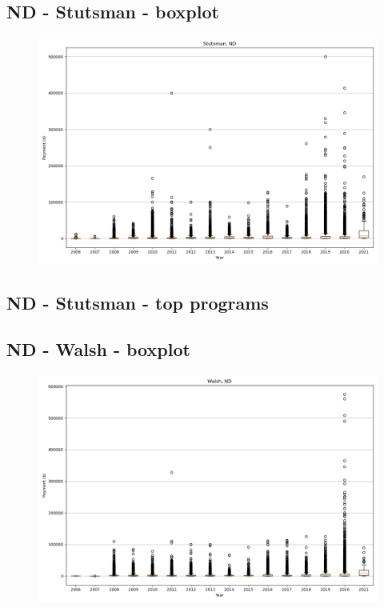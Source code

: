 \subsection*{ND - Stutsman - boxplot}
\begin{figure}[h]
\centering
\includegraphics[width=7in]{../output/boxplots/counties/Stutsman-ND_boxplot.png}
\end{figure}


\subsection*{ND - Stutsman - top programs}

\newpage
\subsection*{ND - Walsh - boxplot}
\begin{figure}[h]
\centering
\includegraphics[width=7in]{../output/boxplots/counties/Walsh-ND_boxplot.png}
\end{figure}


